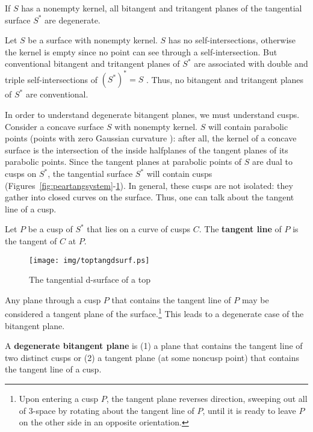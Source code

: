 \documentclass[doublespacing]{elsart}
\begin{document}
\begin{lemma}
\label{lem:degenerate}
If $S$ has a nonempty kernel,
all bitangent and tritangent planes of the tangential surface $S^*$ are 
degenerate.
\end{lemma}
\prf
Let $S$ be a surface with nonempty kernel.
$S$ has no self-intersections, otherwise the kernel is empty
since no point can see through a self-intersection.
But conventional bitangent and tritangent planes of $S^*$ are associated
with double and triple self-intersections of $(S^*)^* = S$ \cite{jj02,jj03tangsurf}.
Thus, no bitangent and tritangent planes of $S^*$ are conventional.
\QED

In order to understand degenerate bitangent planes, we must understand cusps.
Consider a concave
surface $S$ with nonempty kernel.
$S$ will contain parabolic points (points with zero Gaussian curvature \cite{struik}):
after all, the kernel of a concave surface is the intersection of the inside
halfplanes of the tangent planes of its parabolic points.
Since the tangent planes at parabolic points of $S$ are dual to cusps on $S^*$,
the tangential surface $S^*$ will contain cusps 
(Figures~\ref{fig:peartangsystem}-\ref{fig:toptangdsurf}).
In general, these cusps are not isolated: they gather into closed curves on the surface.
Thus, one can talk about the tangent line of a cusp.

\begin{defn2}
\label{defn:tangline}
Let $P$ be a cusp of $S^*$ that lies on a curve of cusps $C$.
The {\bf tangent line} of $P$ is the tangent of $C$ at $P$.
\end{defn2}

\begin{figure}
\begin{center}
\texttt{[image: img/toptangdsurf.ps]}
\end{center}
\caption{The tangential d-surface of a top}
\label{fig:toptangdsurf}
\end{figure}

Any plane through a cusp $P$ that contains the tangent line of $P$ may be considered
a tangent plane of the surface.\footnote{Upon entering a cusp $P$, 
	the tangent plane reverses direction, sweeping out all of 3-space 
	by rotating about the tangent line of $P$,
	until it is ready to leave $P$ on the other side in an opposite orientation.}
This leads to a degenerate case of the bitangent plane.

\begin{defn2}
A {\bf degenerate bitangent plane} is 
(1) a plane that contains the tangent line of two distinct cusps or
(2) a tangent plane (at some noncusp point) that contains the tangent line of a cusp. 
\end{defn2}
\end{document}
